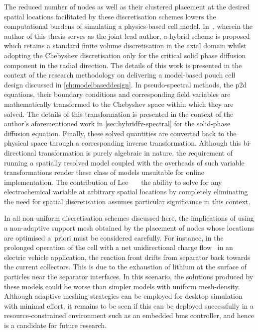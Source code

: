 The  reduced  number   of  nodes  as  well  as  their   clustered  placement  at
the  desired  spatial  locations  facilitated by  these  discretisation  schemes
lowers  the computational  burdens  of simulating  a  physics-based cell  model.
In~\cite{Gopalakrishnan2018}, wherein  the author of  this thesis serves  as the
joint lead author,  a hybrid scheme is proposed which  retains a standard finite
volume  discretisation  in  the  axial  domain  whilst  adopting  the  Chebyshev
discretisation  only for  the critical  solid phase  diffusion component  in the
radial direction. The  details of this work  is presented in the  context of the
research methodology  on delivering  a model-based  pouch cell  design discussed
in  \cref{ch:modelbaseddesign}.   In  pseudo-spectral  methods,   the  \gls{p2d}
equations,  their  boundary conditions  and  corresponding  field variables  are
mathematically transformed to the Chebyshev  space within which they are solved.
The  details  of  this  transformation  is  presented  in  the  context  of  the
author's aforementioned work in \cref{sec:hybridfv-spectral} for the solid-phase
diffusion equation. Finally,  these solved quantities are converted  back to the
physical  space through  a corresponding  inverse transformation.  Although this
bi-directional  transformation is  purely algebraic  in nature,  the requirement
of  running a  spatially  resolved  model coupled  with  the  overheads of  such
variable  transformations render  these class  of models  unsuitable for  online
implementation.  The contribution  of Lee~\etal~\cite{Lee2012a,Lee2012}  \ie~the
ability to solve for any electrochemical variable at arbitrary spatial locations
by completely eliminating the need for spatial discretisation assumes particular
significance in this context.


In all  non-uniform discretisation schemes  discussed here, the  implications of
using  a non-adaptive  support mesh  obtained by  the placement  of nodes  whose
locations are optimised a~priori must  be considered carefully. For instance, in
the prolonged operation of the cell with a net unidirectional charge flow \eg~in
an electric vehicle  application, the reaction front drifts  from separator back
towards the current collectors. This is due  to the exhaustion of lithium at the
surface  of particles  near  the  separator interfaces.  In  this scenario,  the
solutions  produced by  these models  could be  worse than  simpler models  with
uniform mesh-density. Although  adaptive meshing strategies can  be employed for
desktop simulation  with minimal effort,  it remains to be  seen if this  can be
deployed successfully in a resource-constrained  environment such as an embedded
\gls{bms} controller, and hence is a candidate for future research.


